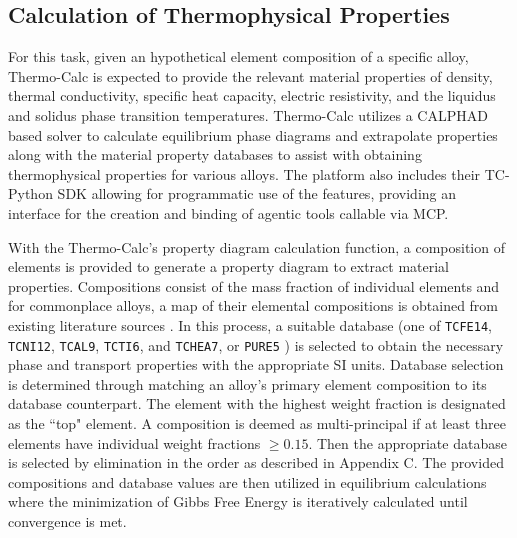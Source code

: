\subsection{Calculation of Thermophysical Properties}
\label{sec:thermo_calc_calcuation}
For this task, given an hypothetical element composition of a specific alloy,
Thermo-Calc \cite{thermo-calc_software_thermo-calc_2025} is expected to provide
the relevant material properties of density, thermal conductivity, specific heat
capacity, electric resistivity, and the liquidus and solidus phase transition
temperatures. Thermo-Calc utilizes a CALPHAD based solver to calculate
equilibrium phase diagrams and extrapolate properties along with the material
property databases to assist with obtaining thermophysical properties for
various alloys. The platform also includes their TC-Python SDK allowing for
programmatic use of the features, providing an interface for the creation and
binding of agentic tools callable via MCP. 

With the Thermo-Calc's property diagram calculation function, a composition of
elements is provided to generate a property diagram to extract material
properties. Compositions consist of the mass fraction of individual elements and
for commonplace alloys, a map of their elemental compositions is obtained from
existing literature sources \cite{akbari_machine_2024, lober_selective_2014,
manfredi_powders_2013, jelis_metallurgical_2015, sun_evaluation_2015,
yadollahi_effects_2015, popovich_microstructure_2016, kok_anisotropy_2018,
schmidtke_process_2011, hack_mechanical_2017, rodriguez_dynamic_2015,
lu_microstructure_2015, tan_graded_2015, vrancken_heat_2012,
edwards_electron_2013}. In this process, a suitable database (one of
\texttt{TCFE14}, \texttt{TCNI12}, \texttt{TCAL9}, \texttt{TCTI6}, and
\texttt{TCHEA7}, or \texttt{PURE5} \cite{saunders_application_1998}) is selected
to obtain the necessary phase and transport properties with the appropriate SI
units. Database selection is determined through matching an alloy's primary
element composition to its database counterpart. The element with the highest
weight fraction is designated as the ``top" element. A composition is deemed as
multi-principal if at least three elements have individual weight fractions
\(\ge 0.15\). Then the appropriate database is selected by elimination in the
order as described in Appendix C. The provided compositions and database values
are then utilized in equilibrium calculations where the minimization of Gibbs
Free Energy is iteratively calculated until convergence is met.

